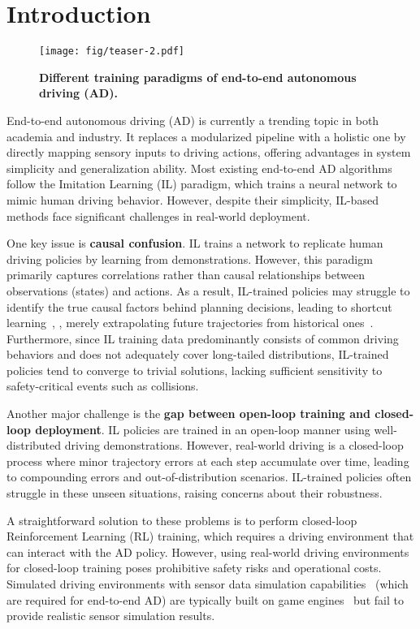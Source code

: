 \section{Introduction}
\label{sec:introduction}
\begin{figure}[ht]
\centering
\vspace{1mm}
\texttt{[image: fig/teaser-2.pdf]} 
\caption{\textbf{Different training paradigms of end-to-end autonomous driving (AD).}  
}
\label{fig:teaser-2}
\end{figure}
End-to-end autonomous driving (AD) is currently a trending topic in both academia and industry. It replaces a modularized pipeline with a holistic one by directly mapping sensory inputs to driving actions, offering advantages in system simplicity and generalization ability.  
Most existing end-to-end AD algorithms~\cite{uniad,vad,zheng2024genad,paradrive,hydramdp,vadv2,sun2024sparsedrive,diffusiondrive} follow the Imitation Learning (IL) paradigm, which trains a neural network to mimic human driving behavior. However, despite their simplicity, IL-based methods face significant challenges in real-world deployment.  

One key issue is \textbf{causal confusion}. IL trains a network to replicate human driving policies by learning from demonstrations.  
However, this paradigm primarily captures correlations rather than causal relationships between observations (states) and actions.  
As a result, IL-trained policies may struggle to identify the true causal factors behind planning decisions, leading to shortcut learning~\cite{shortcut},  
\eg, merely extrapolating future trajectories from historical ones~\cite{egomlp,admlp}.  
Furthermore, since IL training data predominantly consists of common driving behaviors and does not adequately cover long-tailed distributions,  
IL-trained policies tend to converge to trivial solutions, lacking sufficient sensitivity to safety-critical events such as collisions.  

Another major challenge is the \textbf{gap between open-loop training and closed-loop deployment}.  
IL policies are trained in an open-loop manner using well-distributed driving demonstrations.  
However, real-world driving is a closed-loop process where minor trajectory errors at each step accumulate over time,  
leading to compounding errors and out-of-distribution scenarios.  
IL-trained policies often struggle in these unseen situations, raising concerns about their robustness.  

A straightforward solution to these problems is to perform closed-loop Reinforcement Learning (RL) training,  
which requires a driving environment that can interact with the AD policy.  
However, using real-world driving environments for closed-loop training poses prohibitive safety risks and operational costs.  
Simulated driving environments with sensor data simulation capabilities~\cite{carla,carsim} (which are required for end-to-end AD)  
are typically built on game engines~\cite{unreal,unity} but fail to provide realistic sensor simulation results.  

